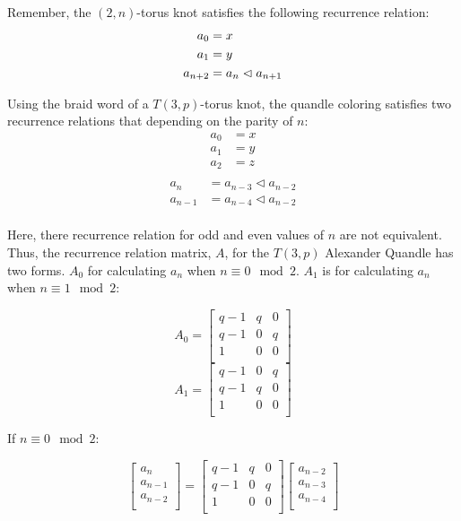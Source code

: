 \documentclass[paper.tex]{subfiles}
\begin{document}
Remember, the $(2,n)$-torus knot satisfies the following recurrence relation:
\begin{align*}
	a_0 &= x \\
	a_1 &= y \\
	a_{n+2} &= a_{n} \vartriangleleft a_{n+1} \\
\end{align*}

Using the braid word of a $T(3,p)$-torus knot, the quandle coloring satisfies two recurrence relations that depending on the parity of $n$: 
\begin{align*}
	a_0 &= x \\
	a_1 &= y \\
	a_2 &= z \\
\end{align*}
\begin{align*}
	a_{n} &= a_{n-3} \triangleleft a_{n-2} \\
	a_{n-1} &= a_{n-4} \triangleleft a_{n-2} \\
\end{align*}

Here, there recurrence relation for odd and even values of $n$ are not equivalent. Thus, the recurrence relation matrix, $A$, for the $T(3, p)$ Alexander Quandle has two forms. $A_{0}$ for calculating $a_{n}$ when $n \equiv 0 \mod 2$. $A_{1}$ is for calculating $a_{n}$ when $n \equiv 1 \mod 2$:

\[ A_{0} = 
\left[ \begin{array}{ccc}
q-1 & q & 0 \\
q-1 & 0 & q \\
1 & 0 & 0 \\
\end{array} \right]
\]
\[ A_{1} = 
\left[ \begin{array}{ccc}
q-1 & 0 & q \\
q-1 & q & 0 \\
1 & 0 & 0 \\
\end{array} \right]
\]

If $n \equiv 0 \mod 2$:

\[ 
\left[ \begin{array}{ccc}
a_{n} \\
a_{n-1} \\
a_{n-2} \\
\end{array} \right] 
=
\left[ \begin{array}{ccc}
q-1 & q & 0 \\
q-1 & 0 & q \\
1 & 0 & 0 \\
\end{array} \right]
\left[ \begin{array}{ccc}
a_{n-2} \\
a_{n-3} \\
a_{n-4} \\
\end{array} \right] 
\] 
\end{document}
